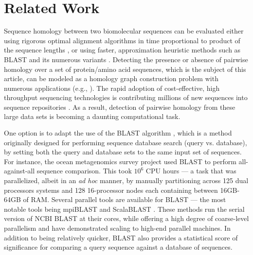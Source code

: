 \documentclass[10pt,journal,letterpaper,compsoc]{IEEEtran}
\begin{document}


\section{Related Work}
\label{secRelatedWork}

Sequence homology between two biomolecular sequences can be evaluated either using rigorous optimal alignment algorithms in time proportional to product of the sequence lengths \cite{Needleman70,Smith81}, or using faster, approximation heuristic methods such as BLAST and its numerous variants \cite{Altschul90}. Detecting the presence or absence of pairwise homology over a set of protein/amino acid sequences, which is the subject of this article, can be modeled as a homology graph construction problem with numerous applications (e.g., \cite{Apweiler04,Bateman04,Enright02,Kriventseva01,Olman07}). The rapid adoption of cost-effective, high throughput sequencing technologies is contributing  millions of new sequences  into sequence repositories \cite{CAMERA,IMG/M,NCBI}. As a result, detection of pairwise homology from these large data sets is becoming a daunting computational task. 

One option is to adapt the use of the BLAST algorithm \cite{Altschul90}, which is a method originally designed for performing sequence database search (query vs. database), by setting both the query and database sets to the same input set of sequences. For instance, the ocean metagenomics survey project \cite{Yooseph07} used BLAST to perform all-against-all sequence comparison. This took $10^6$ CPU hours --- a task that was parallelized, albeit in an {\it ad hoc} manner, by manually partitioning across 125 dual processors systems and 128 16-processor nodes each containing between 16GB-64GB of RAM. Several parallel tools are available for BLAST --- the most notable tools being mpiBLAST \cite{Darling03} and ScalaBLAST \cite{Oehmen06}. These methods run the serial version of NCBI BLAST at their cores, while offering a high degree of coarse-level parallelism and have demonstrated scaling  to high-end parallel machines. In addition to being relatively quicker, BLAST also provides a statistical score of significance for comparing a query sequence against a database of sequences. 
\end{document}
